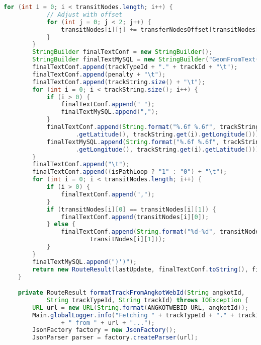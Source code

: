 \begin{lstlisting}[language=Java,basicstyle=\tiny,caption=DataPuller.java]
		for (int i = 0; i < transitNodes.length; i++) {
			// Adjust with offset
			for (int j = 0; j < 2; j++) {
				transitNodes[i][j] += transferNodesOffset[transitNodes[i][j]];
			}
		}
		StringBuilder finalTextConf = new StringBuilder();
		StringBuilder finalTextMySQL = new StringBuilder("GeomFromText('LineString(");
		finalTextConf.append(trackTypeId + "." + trackId + "\t");
		finalTextConf.append(penalty + "\t");
		finalTextConf.append(trackString.size() + "\t");
		for (int i = 0; i < trackString.size(); i++) {
			if (i > 0) {
				finalTextConf.append(" ");
				finalTextMySQL.append(",");
			}
			finalTextConf.append(String.format("%.6f %.6f", trackString.get(i)
					.getLatitude(), trackString.get(i).getLongitude()));
			finalTextMySQL.append(String.format("%.6f %.6f", trackString.get(i)
					.getLongitude(), trackString.get(i).getLatitude()));
		}
		finalTextConf.append("\t");
		finalTextConf.append((isPathLoop ? "1" : "0") + "\t");
		for (int i = 0; i < transitNodes.length; i++) {
			if (i > 0) {
				finalTextConf.append(",");
			}
			if (transitNodes[i][0] == transitNodes[i][1]) {
				finalTextConf.append(transitNodes[i][0]);
			} else {
				finalTextConf.append(String.format("%d-%d", transitNodes[i][0],
						transitNodes[i][1]));
			}
		}
		finalTextMySQL.append(")')");
		return new RouteResult(lastUpdate, finalTextConf.toString(), finalTextMySQL.toString());
	}

	private RouteResult formatTrackFromAngkotWebId(String angkotId,
			String trackTypeId, String trackId) throws IOException {
		URL url = new URL(String.format(ANGKOTWEBID_URL, angkotId));
		Main.globalLogger.info("Fetching " + trackTypeId + "." + trackId
				+ " from " + url + "...");
		JsonFactory factory = new JsonFactory();
		JsonParser parser = factory.createParser(url);


\end{lstlisting}
